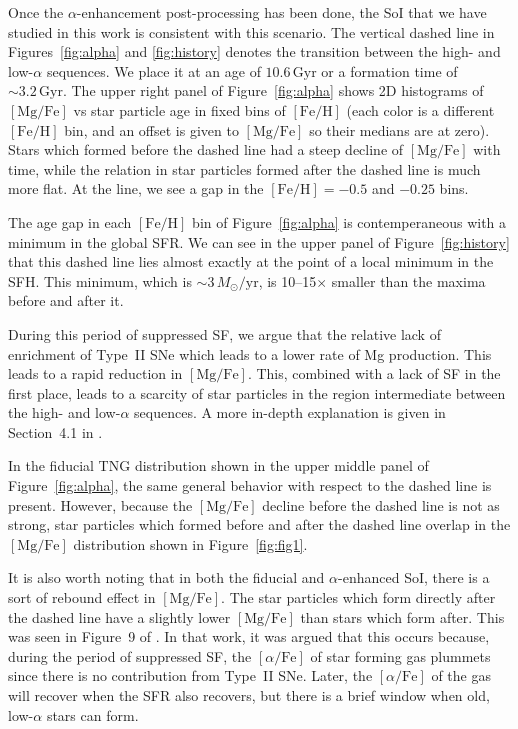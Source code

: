 \documentclass[linenumbers, twocolumn]{aastex631}
\newcommand{\Msun}{\ensuremath{M_{\odot}}}
\newcommand{\Gyr}{\ensuremath{\textrm{Gyr}}}
\newcommand{\FeH}{\ensuremath{[\textrm{Fe}/\textrm{H}]}}
\newcommand{\MgFe}{\ensuremath{[\textrm{Mg}/\textrm{Fe}]}}
\newcommand{\alphaFe}{\ensuremath{[\alpha/\textrm{Fe}]}}
\newcommand{\Msunyr}{\ensuremath{\Msun/\textrm{yr}}}
\begin{document}
Once the $\alpha$-enhancement post-processing has been done, the SoI that we have studied in this work is consistent with this scenario. The vertical dashed line in Figures~\ref{fig:alpha} and \ref{fig:history} denotes the transition between the high- and low-$\alpha$ sequences. We place it at an age of $10.6\,\Gyr$ or a formation time of $\sim3.2\,\Gyr$. The upper right panel of Figure~\ref{fig:alpha} shows 2D histograms of \MgFe{} vs star particle age in fixed bins of \FeH{} (each color is a different \FeH{} bin, and an offset is given to \MgFe{} so their medians are at zero). Stars which formed before the dashed line had a steep decline of \MgFe{} with time, while the relation in star particles formed after the dashed line is much more flat. At the line, we see a gap in the $\FeH=-0.5$ and $-0.25$ bins.

The age gap in each \FeH{} bin of Figure~\ref{fig:alpha} is contemperaneous with a minimum in the global SFR. We can see in the upper panel of Figure~\ref{fig:history} that this dashed line lies almost exactly at the point of a local minimum in the SFH. This minimum, which is $\sim3\,\Msunyr$, is 10--15$\times$ smaller than the maxima before and after it.

During this period of suppressed SF, we argue that the relative lack of enrichment of Type~II SNe which leads to a lower rate of Mg production. This leads to a rapid reduction in \MgFe{}. This, combined with a lack of SF in the first place, leads to a scarcity of star particles in the region intermediate between the high- and low-$\alpha$ sequences. A more in-depth explanation is given in Section~4.1 in \citet{2024arXiv240707985B}. 

In the fiducial TNG distribution shown in the upper middle panel of Figure~\ref{fig:alpha}, the same general behavior with respect to the dashed line is present. However, because the \MgFe{} decline before the dashed line is not as strong, star particles which formed before and after the dashed line overlap in the \MgFe{} distribution shown in Figure~\ref{fig:fig1}. 

It is also worth noting that in both the fiducial and $\alpha$-enhanced SoI, there is a sort of rebound effect in \MgFe{}. The star particles which form directly after the dashed line have a slightly lower \MgFe{} than stars which form after. This was seen in Figure~9 of \citet{2024arXiv240707985B}. In that work, it was argued that this occurs because, during the period of suppressed SF, the \alphaFe{} of star forming gas plummets since there is no contribution from Type~II SNe. Later, the \alphaFe{} of the gas will recover when the SFR also recovers, but there is a brief window when old, low-$\alpha$ stars can form.
\end{document}
